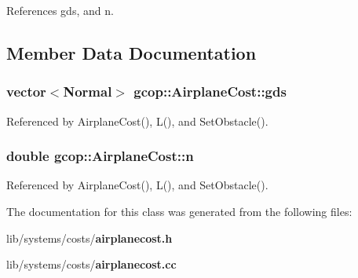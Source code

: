 \-References gds, and n.



\subsection{\-Member \-Data \-Documentation}
\subsubsection[{gds}]{\setlength{\rightskip}{0pt plus 5cm}vector$<${\bf \-Normal}$>$ {\bf gcop\-::\-Airplane\-Cost\-::gds}}\label{classgcop_1_1AirplaneCost_abf84687972c3d4f26f61823e8e667e30}


\-Referenced by \-Airplane\-Cost(), \-L(), and \-Set\-Obstacle().

\subsubsection[{n}]{\setlength{\rightskip}{0pt plus 5cm}double {\bf gcop\-::\-Airplane\-Cost\-::n}}\label{classgcop_1_1AirplaneCost_a27db56f1f0cc60bdc390338eee5dd609}


\-Referenced by \-Airplane\-Cost(), \-L(), and \-Set\-Obstacle().



\-The documentation for this class was generated from the following files\-:\begin{DoxyCompactItemize}
\item 
lib/systems/costs/{\bf airplanecost.\-h}\item 
lib/systems/costs/{\bf airplanecost.\-cc}\end{DoxyCompactItemize}
